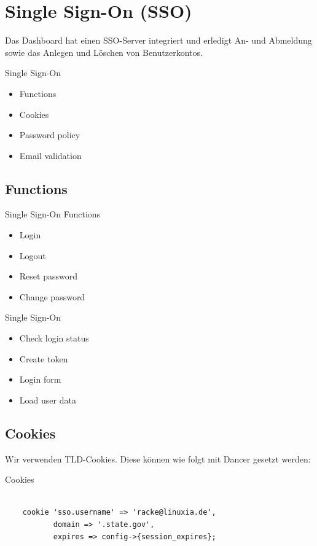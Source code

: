 \section{Single Sign-On (SSO)}

Das Dashboard hat einen SSO-Server integriert und erledigt An- und
Abmeldung sowie das Anlegen und Löschen von Benutzerkontos.

\begin{frame}{Single Sign-On}
\begin{itemize}
\item Functions
\item Cookies
\item Password policy
\item Email validation
\end{itemize}
\end{frame}

\subsection{Functions}

\begin{frame}{Single Sign-On Functions}
\begin{itemize}
\item Login
\item Logout
\item Reset password
\item Change password
\end{itemize}
\end{frame}

\begin{frame}{Single Sign-On}
\begin{itemize}
\item Check login status
\item Create token
\item Login form
\item Load user data
\end{itemize}
\end{frame}

\subsection{Cookies}

Wir verwenden TLD-Cookies. Diese können wie folgt mit Dancer
gesetzt werden:

\begin{frame}[fragile]{Cookies}
\begin{lstlisting}

    cookie 'sso.username' => 'racke@linuxia.de',
           domain => '.state.gov',
           expires => config->{session_expires};

\end{lstlisting}
\end{frame}

